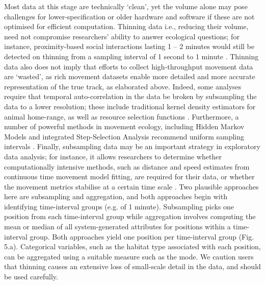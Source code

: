 \begin{refsection}
    Most data at this stage are technically ‘clean’, yet the volume alone may pose challenges for lower-specification or older hardware and software if these are not optimised for efficient computation.
    Thinning data i.e., reducing their volume, need not compromise researchers' ability to answer ecological questions; for instance, proximity-based social interactions lasting 1 -- 2 minutes would still be detected on thinning from a sampling interval of 1 second to 1 minute \citep[][]{aspillaga2021a}.
    Thinning data also does not imply that efforts to collect high-throughput movement data are ‘wasted’, as rich movement datasets enable more detailed and more accurate representation of the true track, as elaborated above. 
    Indeed, some analyses require that temporal auto-correlation in the data be broken by subsampling the data to a lower resolution; these include traditional kernel density estimators for animal home-range, as well as resource selection functions \citep{fleming2014a,manly2007,dupke2017}.
    Furthermore, a number of powerful methods in movement ecology, including Hidden Markov Models and integrated Step-Selection Analysis recommend uniform sampling intervals \citep{avgar2016,langrock2012,michelot2016}.
    Finally, subsampling data may be an important strategy in exploratory data analysis; for instance, it allows researchers to determine whether computationally intensive methods, such as distance and speed estimates from continuous time movement model fitting, are required for their data, or whether the movement metrics stabilise at a certain time scale \citep[][]{noonan2019}.
    Two plausible approaches here are subsampling and aggregation, and both approaches begin with identifying time-interval groups (e.g. of 1 minute).
    Subsampling picks one position from each time-interval group while aggregation involves computing the mean or median of all system-generated attributes for positions within a time-interval group.
    Both approaches yield one position per time-interval group (Fig. 5.a).
    Categorical variables, such as the habitat type associated with each position, can be aggregated using a suitable measure such as the mode.
    We caution users that thinning causes an extensive loss of small-scale detail in the data, and should be used carefully.


\end{refsection}
